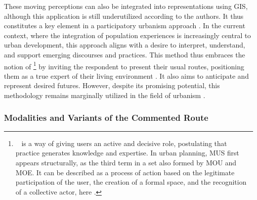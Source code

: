 \begin{refsegment}
These moving perceptions can also be integrated into representations using \acrshort{GIS}, although this application is still underutilized according to the authors. It thus constitutes a key element in a participatory urbanism approach \textcolor{blue}{\autocite[344]{manzo_finding_2006}}. In the current context, where the integration of population experiences is increasingly central to urban development, this approach aligns with a desire to interpret, understand, and support emerging discourses and practices. This method thus embraces the notion of \footnote{~
     is a way of giving users an active and decisive role, postulating that practice generates knowledge and expertise. In urban planning, \acrfull{MUS} first appears structurally, as the third term in a set also formed by \acrfull{MOU} and \acrfull{MOE}. It can be described as a process of action based on the legitimate participation of the user, the creation of a formal space, and the recognition of a collective actor, here  \textcolor{blue}{\autocite[73]{vulbeau_maitrise_2014}}.
} by inviting the respondent to present their usual routes, positioning them as a true expert of their living environment \textcolor{blue}{\autocites[268]{carpiano_come_2009}[1172]{miaux_making_2010}}. It also aims to anticipate and represent desired futures. However, despite its promising potential, this methodology remains marginally utilized in the field of urbanism \textcolor{blue}{\autocite[120]{bergeron_uncovering_2014}}.%

\subsubsection*{Modalities and Variants of the Commented Route
    \label{chap3:parcours-commente-definition-variantes}
    }


\end{refsegment}
